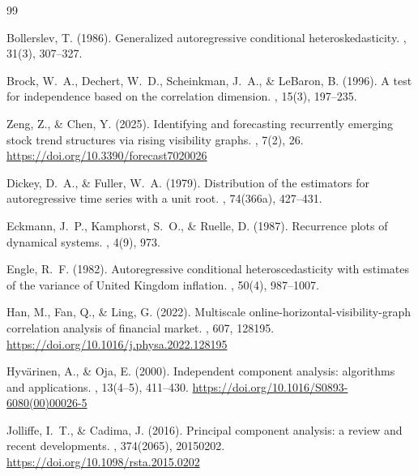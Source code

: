 \documentclass[11pt,a4paper]{article}
\begin{document}
\begin{thebibliography}{99}

Bollerslev, T. (1986).
\newblock Generalized autoregressive conditional heteroskedasticity.
, 31(3), 307--327.

Brock, W.~A., Dechert, W.~D., Scheinkman, J.~A., \& LeBaron, B. (1996).
\newblock A test for independence based on the correlation dimension.
, 15(3), 197--235.

Zeng, Z., \& Chen, Y. (2025).
\newblock Identifying and forecasting recurrently emerging stock trend structures via rising visibility graphs.
, 7(2), 26.
\newblock \url{https://doi.org/10.3390/forecast7020026}

Dickey, D.~A., \& Fuller, W.~A. (1979).
\newblock Distribution of the estimators for autoregressive time series with a unit root.
, 74(366a), 427--431.

Eckmann, J.~P., Kamphorst, S.~O., \& Ruelle, D. (1987).
\newblock Recurrence plots of dynamical systems.
, 4(9), 973.

Engle, R.~F. (1982).
\newblock Autoregressive conditional heteroscedasticity with estimates of the variance of United Kingdom inflation.
, 50(4), 987--1007.

Han, M., Fan, Q., \& Ling, G. (2022).
\newblock Multiscale online-horizontal-visibility-graph correlation analysis of financial market.
, 607, 128195.
\newblock \url{https://doi.org/10.1016/j.physa.2022.128195}

Hyvärinen, A., \& Oja, E. (2000).
\newblock Independent component analysis: algorithms and applications.
, 13(4--5), 411--430.
\newblock \url{https://doi.org/10.1016/S0893-6080(00)00026-5}

Jolliffe, I.~T., \& Cadima, J. (2016).
\newblock Principal component analysis: a review and recent developments.
, 374(2065), 20150202.
\newblock \url{https://doi.org/10.1098/rsta.2015.0202}


\end{thebibliography}
\end{document}
